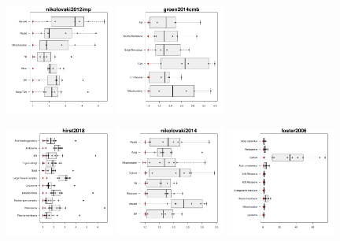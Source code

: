 \documentclass[12pt]{article}\usepackage[]{graphicx}\usepackage[]{color}
\begin{document}
\begin{appendices}
\begin{figure}[htb]
  \includegraphics[width = 0.32\textwidth]{./figure/allqseps-23.pdf}
  \includegraphics[width = 0.32\textwidth]{./figure/allqseps-24.pdf}
\end{figure}
\begin{figure}[htb]
  \includegraphics[width = 0.32\textwidth]{./figure/allqseps-25.pdf}
  \includegraphics[width = 0.32\textwidth]{./figure/allqseps-26.pdf}
  \includegraphics[width = 0.32\textwidth]{./figure/allqseps-27.pdf}

\end{figure}
\end{appendices}
\end{document}
